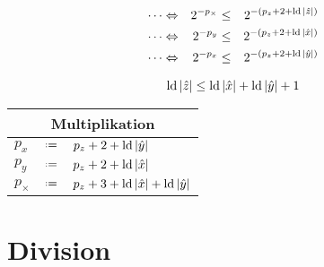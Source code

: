 \begin{equation*}
\begin{split}
  \cdots
  & \Leftrightarrow & 
  2^{-{p_\times}} & \le & 2^{-(p_z+2+\mathop{\rm ld}\nolimits|\hat{z}|)}
  \\
  \cdots
  & \Leftrightarrow & 
  2^{-p_y}  & \le & 2^{-(p_z+2+\mathop{\rm ld}\nolimits|\hat{x}|)}
  \\
  \cdots
  & \Leftrightarrow & 
  2^{-p_x} & \le & 2^{-(p_z+2+\mathop{\rm ld}\nolimits|\hat{y}|)}
  \\
\end{split}
\end{equation*}

\begin{equation*}
  \mathop{\rm ld}\nolimits|\hat{z}| \le \mathop{\rm ld}\nolimits|\hat{x}|+\mathop{\rm ld}\nolimits|\hat{y}|+1
\end{equation*}

\begin{algorithm}
\phantom{}
\begin{center}
\renewcommand*{\arraystretch}{1.3}
\begin{tabular}{lcl}
  \hline
  \multicolumn{3}{c}{Multiplikation} \\
  \hline
   $p_x$      & $\defeq$ & $p_z+2+\mathop{\rm ld}\nolimits|\hat{y}|$ \\
   $p_y$      & $\defeq$ & $p_z+2+\mathop{\rm ld}\nolimits|\hat{x}|$ \\
   $p_\times$ & $\defeq$ & $p_z+3+\mathop{\rm ld}\nolimits|\hat{x}|+\mathop{\rm ld}\nolimits|\hat{y}|$ \\
  \hline
\end{tabular}
\end{center}
\end{algorithm}




\pagebreak
\section{Division}

